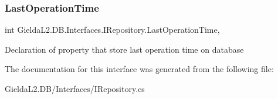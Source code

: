 \subsubsection{\texorpdfstring{LastOperationTime}{LastOperationTime}}
{\footnotesize\ttfamily int Gielda\+L2.\+D\+B.\+Interfaces.\+I\+Repository.\+Last\+Operation\+Time\hspace{0.3cm}{\ttfamily [get]}, {\ttfamily [set]}}



Declaration of property that store last operation time on database 



The documentation for this interface was generated from the following file\+:\begin{DoxyCompactItemize}
\item 
Gielda\+L2.\+D\+B/\+Interfaces/I\+Repository.\+cs\end{DoxyCompactItemize}
